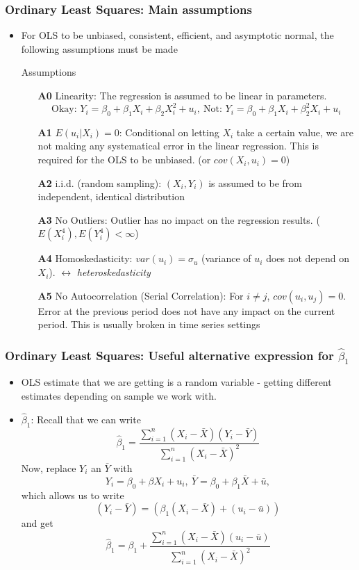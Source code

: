 \documentclass[aspectratio=169]{beamer}
\begin{document}
\begin{frame}
\frametitle{Ordinary Least Squares: Main assumptions}
\begin{itemize}
\item For OLS to be unbiased, consistent, efficient, and asymptotic normal, the following assumptions must be made
\begin{block}{Assumptions}
\begin{itemize}
\item[\textbf{A0}] Linearity: The regression is assumed to be linear in parameters.
\[
\text{Okay: } Y_i = \beta_0 + \beta_1X_i + \beta_2X_i^2+u_i, \ \text{Not: } Y_i = \beta_0 + \beta_1X_i + \beta_2^2X_i+u_i
\]
\item[\textbf{A1}] $E(u_i|X_i)=0$: Conditional on letting $X_i$ take a certain value, we are not making any systematical error in the linear regression. This is required for the OLS to be unbiased. (or $cov(X_i, u_i)=0$)
\item[\textbf{A2}] i.i.d. (random sampling): $(X_i,Y_i)$ is assumed to be from independent, identical distribution
\item[\textbf{A3}] No Outliers: Outlier has no impact on the regression results. ($E(X_i^4), E(Y_i^4)<\infty$)
\item[\textbf{A4}] Homoskedasticity: $var(u_i)=\sigma_u$ (variance of $u_i$ does not depend on $X_i$). $\leftrightarrow$ \textit{heteroskedasticity}
\item[\textbf{A5}] No Autocorrelation (Serial Correlation): For $i\neq j$, $cov(u_i,u_j)=0$. Error at the previous period does not have any impact on the current period. This is usually broken in time series settings

\end{itemize}
\end{block}
\end{itemize}
\end{frame}


\begin{frame}
\frametitle{Ordinary Least Squares: Useful alternative expression for $\hat{\beta}_1$ }
\begin{itemize}
\item OLS estimate that we are getting is a random variable - getting different estimates depending on sample we work with. 
\item$\hat{\beta}_1$: Recall that we can write
\[
\hat{\beta}_1= \frac{\sum_{i=1}^n(X_i-\bar{X})(Y_i-\bar{Y})}{\sum_{i=1}^n(X_i-\bar{X})^2}
\]
Now, replace $Y_i$ an $\bar{Y}$ with 
\[
Y_i =\beta_0 + \beta X_i + u_i, \ \bar{Y} = \beta_0 + \beta_1\bar{X} + \bar{u},
\]
which allows us to write 
\[
(Y_i-\bar{Y}) = (\beta_1(X_i-\bar{X})+(u_i-\bar{u}))
\]
and get
\[
\hat{\beta}_1=\beta_1+  \frac{\sum_{i=1}^n(X_i-\bar{X})(u_i-\bar{u})}{\sum_{i=1}^n(X_i-\bar{X})^2}
\]

\end{itemize}
\end{frame}
\end{document}
